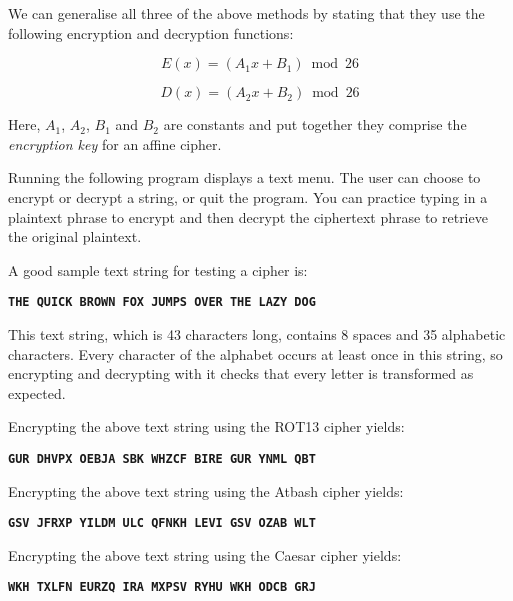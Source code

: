 We can generalise all three of the above methods by stating that they use the following encryption and decryption functions:

\[
 E(x) = (A_{1}x + B_{1}) \bmod 26
\]

\[
 D(x) = (A_{2}x + B_{2}) \bmod 26
\]

Here, $A_{1}$, $A_{2}$, $B_{1}$ and $B_{2}$ are constants and put together they comprise the {\it encryption key} for an affine cipher.

Running the following program displays a text menu. The user can choose to encrypt or decrypt a string, or quit the program. You can practice typing in a plaintext phrase to encrypt and then decrypt the ciphertext phrase to retrieve the original plaintext.

A good sample text string for testing a cipher is:

\texttt{\bf THE QUICK BROWN FOX JUMPS OVER THE LAZY DOG}

This text string, which is 43 characters long, contains 8 spaces and 35 alphabetic characters. Every character of the alphabet occurs at least once in this string, so encrypting and decrypting with it checks that every letter is transformed as expected.

Encrypting the above text string using the ROT13 cipher yields:

\texttt{\bf GUR DHVPX OEBJA SBK WHZCF BIRE GUR YNML QBT}

Encrypting the above text string using the Atbash cipher yields:

\texttt{\bf GSV JFRXP YILDM ULC QFNKH LEVI GSV OZAB WLT}

Encrypting the above text string using the Caesar cipher yields:

\texttt{\bf WKH TXLFN EURZQ IRA MXPSV RYHU WKH ODCB GRJ}

